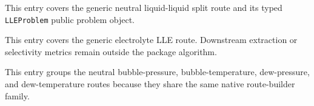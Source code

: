\documentclass[12pt, letterpaper]{article}
\begin{document}
This entry covers the generic neutral liquid-liquid split route and its typed
\texttt{LLEProblem} public problem object.


This entry covers the generic electrolyte LLE route. Downstream extraction or
selectivity metrics remain outside the package algorithm.


This entry groups the neutral bubble-pressure, bubble-temperature,
dew-pressure, and dew-temperature routes because they share the same native
route-builder family.

\end{document}
